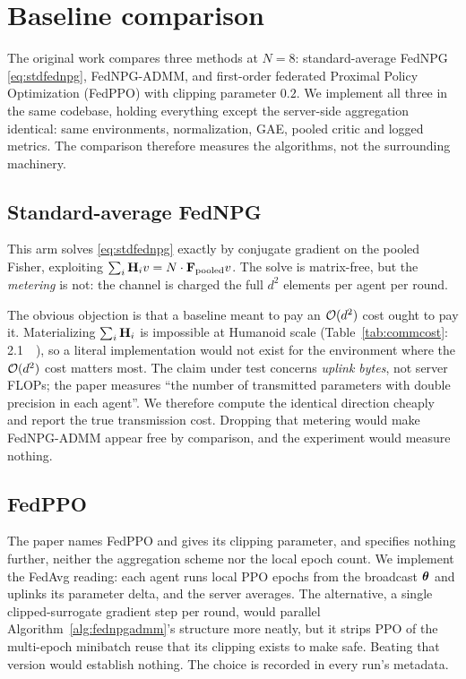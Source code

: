 \section{Baseline comparison}
\label{sec:baselines}

The original work compares three methods at $N = 8$: standard-average FedNPG
\eqref{eq:stdfednpg}, FedNPG-ADMM, and first-order federated Proximal Policy Optimization (FedPPO) with clipping
parameter $0.2$. We implement all three in the same codebase, holding
everything except the server-side aggregation identical: same environments,
normalization, GAE, pooled critic and logged metrics. The comparison therefore
measures the algorithms, not the surrounding machinery.

\subsection{Standard-average FedNPG}

This arm solves \eqref{eq:stdfednpg} exactly by conjugate gradient on the
pooled Fisher, exploiting $\sum_i \mathbf{H}_i v = N \cdot \mathbf{F}_{\text{pooled}} v$.
The solve is matrix-free, but the \emph{metering} is not: the channel is
charged the full $d^2$ elements per agent per round.

The obvious objection is that a baseline meant to pay an $\mathcal{O}(d^2)$ cost ought
to pay it. Materializing $\sum_i \mathbf{H}_i$ is impossible at Humanoid scale
(Table~\ref{tab:commcost}: \SI{2.1}{\peta\byte}), so a literal implementation
would not exist for the environment where the $\mathcal{O}(d^2)$ cost matters most.
The claim under test concerns \emph{uplink bytes}, not server FLOPs; the paper
measures ``the number of transmitted parameters with double precision in each
agent''. We therefore compute the identical direction cheaply and report the
true transmission cost. Dropping that metering would make FedNPG-ADMM appear
free by comparison, and the experiment would measure nothing.

\subsection{FedPPO}

The paper names FedPPO and gives its clipping parameter, and specifies nothing further, neither the aggregation scheme nor the local
epoch count. We implement the
FedAvg reading: each agent runs local PPO epochs from the broadcast $\boldsymbol{\theta}$
and uplinks its parameter delta, and the server averages. The alternative, a
single clipped-surrogate gradient step per round, would parallel
Algorithm~\ref{alg:fednpgadmm}'s structure more neatly, but it strips PPO of
the multi-epoch minibatch reuse that its clipping exists to make safe. Beating
that version would establish nothing. The choice is recorded in every run's
metadata.

